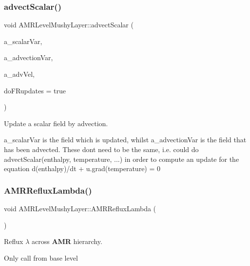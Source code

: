 \subsubsection{\texorpdfstring{advect\+Scalar()}{advectScalar()}}
{\footnotesize\ttfamily void A\+M\+R\+Level\+Mushy\+Layer\+::advect\+Scalar (\begin{DoxyParamCaption}\item[{const int}]{a\+\_\+scalar\+Var,  }\item[{const int}]{a\+\_\+advection\+Var,  }\item[{\textbf{ Level\+Data}$<$ \textbf{ Flux\+Box} $>$ \&}]{a\+\_\+adv\+Vel,  }\item[{bool}]{do\+F\+Rupdates = {\ttfamily true} }\end{DoxyParamCaption})\hspace{0.3cm}{\ttfamily [protected]}}



Update a scalar field by advection. 

a\+\_\+scalar\+Var is the field which is updated, whilst a\+\_\+advection\+Var is the field that has been advected. These don\textquotesingle{}t need to be the same, i.\+e. could do advect\+Scalar(enthalpy, temperature, ...) in order to compute an update for the equation d(enthalpy)/dt + u.\+grad(temperature) = 0 \mbox{\label{class_a_m_r_level_mushy_layer_a57a9b87c77a7e0aa8b9082dc1a20959d}} 
\subsubsection{\texorpdfstring{A\+M\+R\+Reflux\+Lambda()}{AMRRefluxLambda()}}
{\footnotesize\ttfamily void A\+M\+R\+Level\+Mushy\+Layer\+::\+A\+M\+R\+Reflux\+Lambda (\begin{DoxyParamCaption}{ }\end{DoxyParamCaption})\hspace{0.3cm}{\ttfamily [protected]}}



Reflux $ \lambda $ across \textbf{ A\+MR} hierarchy. 

Only call from base level \mbox{\label{class_a_m_r_level_mushy_layer_a0169d83decd5824058e36a4b126f762a}} 
